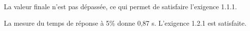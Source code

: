 \documentclass[10pt,fleqn]{article} %
\begin{document}
\begin{multicols}{2}
\begin{corrige}
La valeur finale n'est pas dépassée, ce qui permet de satisfaire l'exigence 1.1.1. 

La mesure du temps de réponse à 5\% donne 0,87 s. L'exigence 1.2.1 est satisfaite.
\end{corrige}


\end{multicols}


\begin{center}
\end{center}
\end{document}
